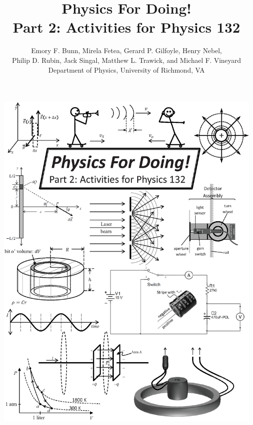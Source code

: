 \thispagestyle{empty}

\begin{center}
\includegraphics[width=7.3in]{132_front_pages/132_front_cover.eps}
\end{center}
\newpage

\restoregeometry

\title{Physics For Doing!\\
Part 2: Activities for Physics 132}

\author{Emory F. Bunn, Mirela Fetea, Gerard P. Gilfoyle, Henry Nebel, \\
Philip D. Rubin, Jack Singal, Matthew L. Trawick, and Michael F. Vineyard\\[4pt]
Department of Physics, University of Richmond, VA \\[4pt]
}

